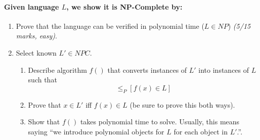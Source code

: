 \documentclass[a4paper,12pt]{report}
\begin{document}
\paragraph{Given language $L$, we show it is NP-Complete by:} 
\begin{enumerate}
\item Prove that the language can be verified in polynomial time ($L\in NP$) \textit{(5/15 marks, easy)}.
\item Select known $L'\in NPC$.
\begin{enumerate}
\item Describe algorithm $f()$ that converts instances of $L'$ into instances of $L$ such that 
\begin{equation}
[x\in L'] \leq_P [f(x)\in L]
\end{equation}
\item Prove that $x\in L'$ iff $f(x)\in L$ (be sure to prove this both ways).
\item Show that $f()$ takes polynomial time to solve. Usually, this means saying ``we introduce polynomial objects for $L$ for each object in $L'$.''. 
\end{enumerate}
\end{enumerate}
\end{document}
